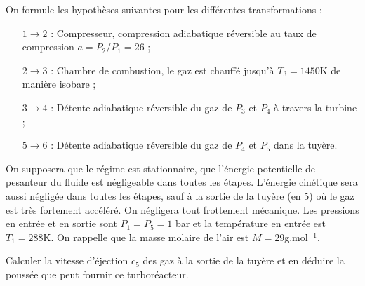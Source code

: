 On formule les hypothèses suivantes pour les différentes transformations :
\begin{itemize}

	\item[$1\rightarrow2$ :] Compresseur, compression adiabatique réversible au taux de compression $a=P_2/P_1=26$ ;
	\item[$2\rightarrow3$ :] Chambre de combustion, le gaz est chauffé jusqu'à $T_3=1450$K de manière isobare ;
	\item[$3\rightarrow4$ :] Détente adiabatique réversible du gaz de $P_3$ et $P_4$ à travers la turbine ;
	\item[$5\rightarrow6$ :] Détente adiabatique réversible du gaz de $P_4$ et $P_5$ dans la tuyère.

\end{itemize}

On supposera que le régime est stationnaire, que l'énergie potentielle de pesanteur du fluide est négligeable dans toutes les étapes. L'énergie cinétique sera aussi négligée dans toutes les étapes, sauf à la sortie de la tuyère (en 5) où le gaz est très fortement accéléré. On négligera tout frottement mécanique. Les pressions en entrée et en sortie sont $P_1=P_5=1$ bar et la température en entrée est $T_1=288$K. On rappelle que la masse molaire de l'air est $M=29$g.mol$^{-1}$. 

\vspace{1cm}

Calculer la vitesse d'éjection $c_5$ des gaz à la sortie de la tuyère et en déduire la poussée que peut fournir ce turboréacteur.

\newpage

